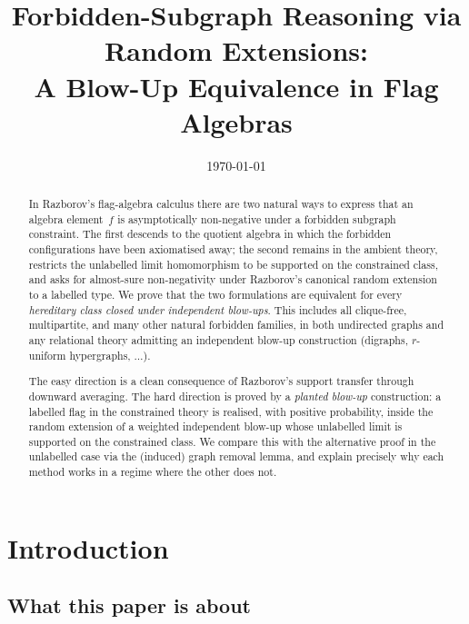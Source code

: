 \documentclass[11pt]{article}
\title{Forbidden-Subgraph Reasoning via Random Extensions:\\
       A Blow-Up Equivalence in Flag Algebras}
\author{}
\date{\today}
\theoremstyle{definition}
\begin{document}
\maketitle

\begin{abstract}
In Razborov's flag-algebra calculus there are two natural ways to express
that an algebra element~$f$ is asymptotically non-negative under a forbidden
subgraph constraint. The first descends to the quotient algebra in which the
forbidden configurations have been axiomatised away; the second remains in
the ambient theory, restricts the unlabelled limit homomorphism to be
supported on the constrained class, and asks for almost-sure non-negativity
under Razborov's canonical random extension to a labelled type.
We prove that the two formulations are equivalent for every \emph{hereditary
class closed under independent blow-ups}.  This includes all clique-free,
multipartite, and many other natural forbidden families, in both undirected
graphs and any relational theory admitting an independent blow-up
construction (digraphs, $r$-uniform hypergraphs, $\ldots$).

The easy direction is a clean consequence of Razborov's support transfer
through downward averaging.  The hard direction is proved by a
\emph{planted blow-up} construction: a labelled flag in the constrained
theory is realised, with positive probability, inside the random extension
of a weighted independent blow-up whose unlabelled limit is supported on the
constrained class.  We compare this with the alternative proof in the
unlabelled case via the (induced) graph removal lemma, and explain
precisely why each method works in a regime where the other does not.
\end{abstract}

\tableofcontents

\section{Introduction}

\subsection{What this paper is about}
\end{document}
